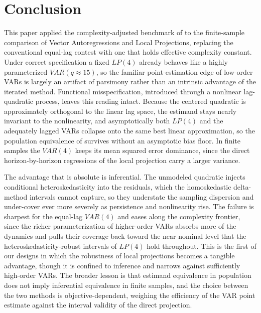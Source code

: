 \section{Conclusion}
This paper applied the complexity-adjusted benchmark of \textcite{ludwig2026local} to the
finite-sample comparison of Vector Autoregressions and Local Projections, replacing the
conventional equal-lag contest with one that holds effective complexity constant. Under correct
specification a fixed $LP(4)$ already behaves like a highly parameterized $VAR(q \approx 15)$, so
the familiar point-estimation edge of low-order VARs is largely an artifact of parsimony rather
than an intrinsic advantage of the iterated method. Functional misspecification, introduced
through a nonlinear lag-quadratic process, leaves this reading intact. Because the centered
quadratic is approximately orthogonal to the linear lag space, the estimand stays nearly invariant
to the nonlinearity, and asymptotically both $LP(4)$ and the adequately lagged VARs collapse onto
the same best linear approximation, so the population equivalence of \textcite{plagborg2021local}
survives without an asymptotic bias floor. In finite samples the $VAR(4)$ keeps its mean squared
error dominance, since the direct horizon-by-horizon regressions of the local projection carry a
larger variance.

The advantage that is absolute is inferential. The unmodeled quadratic injects conditional
heteroskedasticity into the residuals, which the homoskedastic delta-method intervals cannot
capture, so they understate the sampling dispersion and under-cover ever more severely as
persistence and nonlinearity rise. The failure is sharpest for the equal-lag $VAR(4)$ and eases
along the complexity frontier, since the richer parameterization of higher-order VARs absorbs more
of the dynamics and pulls their coverage back toward the near-nominal level that the
heteroskedasticity-robust intervals of $LP(4)$ hold throughout. This is the first of our designs in
which the robustness of local projections becomes a tangible advantage, though it is confined to
inference and narrows against sufficiently high-order VARs. The broader lesson is that estimand
equivalence in population does not imply inferential equivalence in finite samples, and the choice
between the two methods is objective-dependent, weighing the efficiency of the VAR point estimate
against the interval validity of the direct projection.

